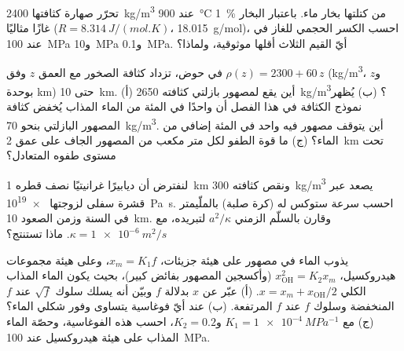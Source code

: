 \begin{exercise}[$\star\star$]\label{exo:b2:magma-emplacement:7}
تحرّر صهارة كثافتها \qty{2400}{kg/m^3} عند \qty{900}{\celsius}
\qty{1}{\percent} من كتلتها بخار ماء. باعتبار البخار غازًا مثاليًا
($R = \qty{8.314}{J/(mol.K)}$، \qty{18.015}{g/mol})، احسب الكسر الحجمي
للغاز في  عند \qty{100}{MPa} و\qty{10}{MPa} و\qty{0.1}{MPa}. أيّ
القيم الثلاث أقلها موثوقية، ولماذا؟
\end{exercise}

\begin{exercise}[$\star\star$]\label{exo:b2:magma-emplacement:8}
في حوض، تزداد كثافة الصخور مع العمق $z$ وفق $\rho(z) =
2300 + 60\,z$ (\unit{kg/m^3}، و$z$ بوحدة \unit{km}) حتى \qty{10}{km}. (أ) أين يقع
 لمصهور بازلتي كثافته \qty{2650}{kg/m^3}؟ (ب) يُظهر
نموذج الكثافة في هذا الفصل أن واحدًا في المئة من الماء المذاب يُخفض
كثافة المصهور البازلتي بنحو \qty{70}{kg/m^3}. أين يتوقف مصهور فيه
واحد في المئة إضافي من الماء؟ (ج) ما قوة الطفو لكل متر مكعب
من المصهور الجاف على عمق \qty{2}{km} تحت مستوى طفوه المتعادل؟
\end{exercise}

\begin{exercise}[$\star\star$]\label{exo:b2:magma-emplacement:9}
لنفترض أن ديابيرًا غرانيتيًا نصف قطره \qty{1}{km} ونقص كثافته
\qty{300}{kg/m^3} يصعد عبر قشرة سفلى لزوجتها \qty{e19}{Pa.s}. احسب
سرعة ستوكس له (كرة صلبة) بالملّيمتر في السنة وزمن الصعود
\qty{10}{km}. وقارن بالسلّم الزمني $a^2/\kappa$ لتبريده، مع $\kappa
= \qty{1e-6}{m^2/s}$. ماذا تستنتج؟
\end{exercise}

\begin{exercise}[$\star\star\star$]\label{exo:b2:magma-emplacement:10}
يذوب الماء في مصهور على هيئة جزيئات، $x_m = K_1 f$، وعلى هيئة مجموعات
هيدروكسيل، $x_{\mathrm{OH}}^2 = K_2 x_m$ (وأكسجين المصهور بفائض كبير)، بحيث
يكون الماء المذاب الكلي $x = x_m + x_{\mathrm{OH}}/2$. (أ) عبّر عن $x$ بدلالة
$f$ وبيّن أنه يسلك سلوك $\sqrt f$ عند $f$ المنخفضة وسلوك $f$ عند
$f$ المرتفعة. (ب) عند أيّ فوغاسية يتساوى وفور شكلي الماء؟ (ج)
مع $K_1 = \qty{1e-4}{MPa^{-1}}$ و$K_2 = 0.2$، احسب هذه الفوغاسية،
وحصّة الماء المذاب على هيئة هيدروكسيل عند \qty{100}{MPa}.
\end{exercise}

